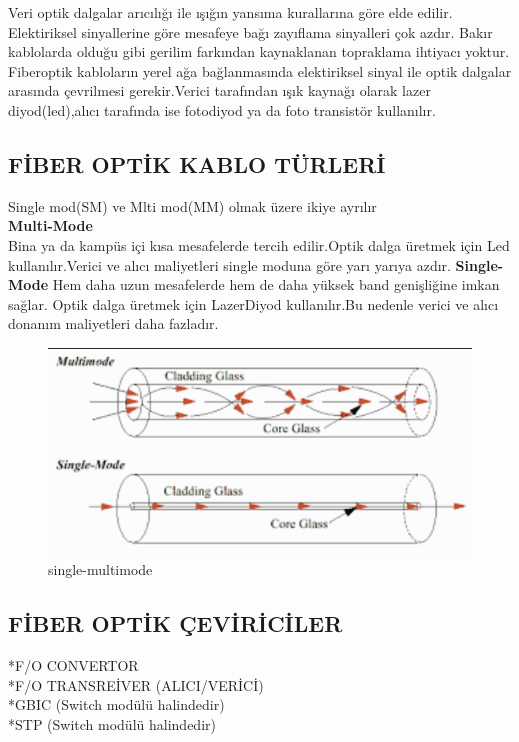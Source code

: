  Veri optik dalgalar arıcılığı ile ışığın yansıma kurallarına göre elde edilir.
 Elektiriksel sinyallerine göre mesafeye bağı zayıflama sinyalleri çok azdır.
 Bakır kablolarda olduğu gibi gerilim farkından kaynaklanan topraklama ihtiyacı yoktur.
 Fiberoptik kabloların yerel ağa bağlanmasında elektiriksel sinyal ile optik dalgalar arasında çevrilmesi gerekir.Verici tarafından ışık kaynağı olarak lazer diyod(led),alıcı tarafında ise fotodiyod ya da foto transistör kullanılır.
\subsection{FİBER OPTİK KABLO TÜRLERİ}
Single mod(SM) ve Mlti mod(MM) olmak üzere ikiye ayrılır\\
\textbf{Multi-Mode}\\
Bina ya da kampüs içi kısa mesafelerde tercih edilir.Optik dalga üretmek için Led kullanılır.Verici ve alıcı maliyetleri single moduna göre yarı yarıya azdır.
\textbf{Single-Mode}
Hem daha uzun mesafelerde hem de daha yüksek band genişliğine imkan sağlar.
Optik dalga üretmek için LazerDiyod kullanılır.Bu nedenle verici ve alıcı donanım maliyetleri daha fazladır.

\begin{figure}[!ht]
  \includegraphics{images/single-multimode}
 \caption{single-multimode}
 \label{fig:single_multi_mode}
\end{figure}
\subsection*{FİBER OPTİK ÇEVİRİCİLER}
*F/O CONVERTOR \\
*F/O TRANSREİVER (ALICI/VERİCİ)\\
*GBIC  (Switch modülü halindedir) \\
*STP  (Switch modülü halindedir) \\

